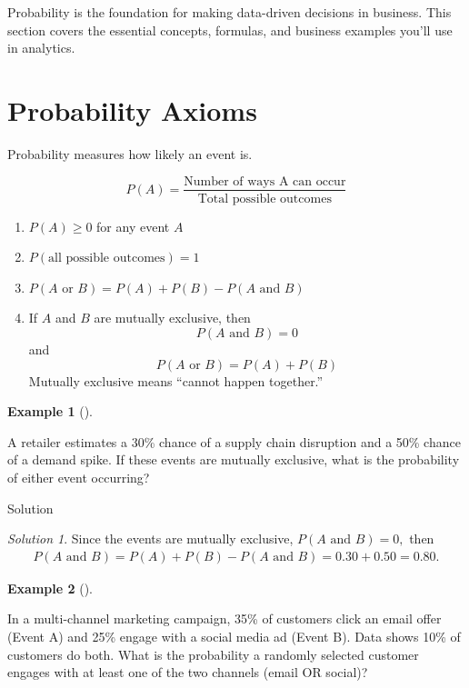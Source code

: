\documentclass[
  12pt,
  letterpaper,
]{scrbook}
\providecommand{\tightlist}{%
  \setlength{\itemsep}{0pt}\setlength{\parskip}{0pt}}
\renewcommand{\tightlist}{\setlength{\itemsep}{0.5\baselineskip}\setlength{\parskip}{0.2\baselineskip}}
\theoremstyle{plain}
\theoremstyle{definition}
\newtheorem{example}{Example}[chapter]
\theoremstyle{remark}
\newtheorem{refsolution}{Solution}[chapter]
\begin{document}
Probability is the foundation for making data-driven decisions in
business. This section covers the essential concepts, formulas, and
business examples you'll use in analytics.

\section{Probability Axioms}\label{probability-axioms}

Probability measures how likely an event is.

\[P(A) = \frac{\text{Number of ways A can occur}}{\text{Total possible outcomes}}\]

\begin{enumerate}
\def\labelenumi{\arabic{enumi}.}
\tightlist
\item
  \(P(A) \geq 0\) for any event \(A\)
\item
  \(P(\text{all possible outcomes}) = 1\)
\item
  \(P(A \text{ or } B) = P(A) + P(B) - P(A\text{ and }B)\)
\item
  If \(A\) and \(B\) are mutually exclusive, then \[
  P(A \text{ and } B) = 0
  \] and \[
  P(A \text{ or } B) = P(A) + P(B)
  \] Mutually exclusive means ``cannot happen together.''
\end{enumerate}

\begin{example}[]\protect\hypertarget{exm-1}{}\label{exm-1}

A retailer estimates a 30\% chance of a supply chain disruption and a
50\% chance of a demand spike. If these events are mutually exclusive,
what is the probability of either event occurring?

\end{example}

Solution

\begin{refsolution}
Since the events are mutually exclusive, \(P(A \text{ and } B)=0,\) then
\[
\begin{split}
P(A \text{ and } B)=P(A)+P(B)-P(A \text{ and } B)=0.30+0.50=0.80.
\end{split}
\]

\label{sol-1}

\end{refsolution}

\begin{example}[]\protect\hypertarget{exm-2}{}\label{exm-2}

In a multi-channel marketing campaign, 35\% of customers click an email
offer (Event A) and 25\% engage with a social media ad (Event B). Data
shows 10\% of customers do both. What is the probability a randomly
selected customer engages with at least one of the two channels (email
OR social)?

\end{example}
\end{document}
